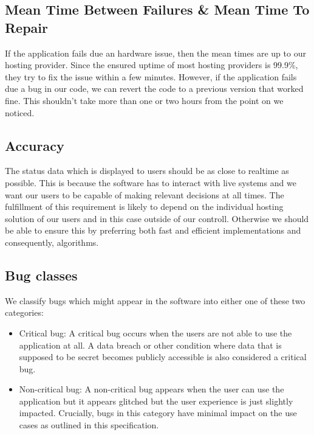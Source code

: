 \documentclass[a4paper,12pt,chapterprefix=false,bibliography=totoc,listof=totoc,]{scrreprt}
\begin{document}
\subsection{{\color{magenta} Mean Time Between Failures \& Mean Time To Repair}}
{\color{magenta}
If the application fails due an hardware issue, then the mean times are up to our hosting provider. Since the ensured uptime of most hosting providers is 99.9\%, they try to fix the issue within a few minutes. However, if the application fails due a bug in our code, we can revert the code to a previous version that worked fine. This shouldn't take more than one or two hours from the point on we noticed.
}

\subsection{{\color{magenta} Accuracy}}
{\color{magenta}
The status data which is displayed to users should be as close to realtime as possible. This is because the software has to interact with live systems and we want our users to be capable of making relevant decisions at all times. The fulfillment of this requirement is likely to depend on the individual hosting solution of our users and in this case outside of our controll. Otherwise we should be able to ensure this by preferring both fast and efficient implementations and consequently, algorithms.
}

\subsection{{\color{magenta} Bug classes}}
{\color{magenta}
We classify bugs which might appear in the software into either one of these two categories:

\begin{itemize}
    \item Critical bug: A critical bug occurs when the users are not able to use the application at all. A data breach or other condition where data that is supposed to be secret becomes publicly accessible is also considered a critical bug.
    \item Non-critical bug: A non-critical bug appears when the user can use the application but it appears glitched but the user experience is just slightly impacted. Crucially, bugs in this category have minimal impact on the use cases as outlined in this specification.
\end{itemize}
}
\end{document}
